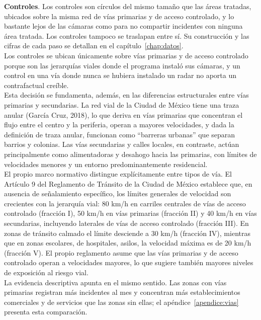 \textbf{Controles}. Los controles son círculos del mismo tamaño que las áreas tratadas, ubicados sobre la misma red de vías primarias y de acceso controlado, y lo bastante lejos de las cámaras como para no compartir incidentes con ninguna área tratada. Los controles tampoco se traslapan entre sí. Su construcción y las cifras de cada paso se detallan en el capítulo~\ref{chap:datos}.\\

Los controles se ubican únicamente sobre vías primarias y de acceso controlado porque son las jerarquías viales donde el programa instaló sus cámaras, y un control en una vía donde nunca se hubiera instalado un radar no aporta un contrafactual creíble.\\ 

Esta decisión se fundamenta, además, en las diferencias estructurales entre vías primarias y secundarias. La red vial de la Ciudad de México tiene una traza anular (García Cruz, 2018), lo que deriva en vías primarias que concentran el flujo entre el centro y la periferia, operan a mayores velocidades, y dada la definición de traza anular, funcionan como ``barreras urbanas'' que separan barrios y colonias. Las vías secundarias y calles locales, en contraste, actúan principalmente como alimentadoras y desahogo hacia las primarias, con límites de velocidades menores y un entorno predominantemente residencial.\\

El propio marco normativo distingue explícitamente entre tipos de vía. El Artículo 9 del Reglamento de Tránsito de la Ciudad de México establece que, en ausencia de señalamiento específico, los límites generales de velocidad son crecientes con la jerarquía vial: 80 km/h en carriles centrales de vías de acceso controlado (fracción I), 50 km/h en vías primarias (fracción II) y 40 km/h en vías secundarias, incluyendo laterales de vías de acceso controlado (fracción III). En zonas de tránsito calmado el límite desciende a 30 km/h (fracción IV), mientras que en zonas escolares, de hospitales, asilos, la velocidad máxima es de 20 km/h (fracción V). El propio reglamento asume que las vías primarias y de acceso controlado operan a velocidades mayores, lo que sugiere también mayores niveles de exposición al riesgo vial.\\ 

La evidencia descriptiva apunta en el mismo sentido. Las zonas con vías primarias registran más incidentes al mes y concentran más establecimientos comerciales y de servicios que las zonas sin ellas; el apéndice~\ref{apendice:vias} presenta esta comparación.\\

